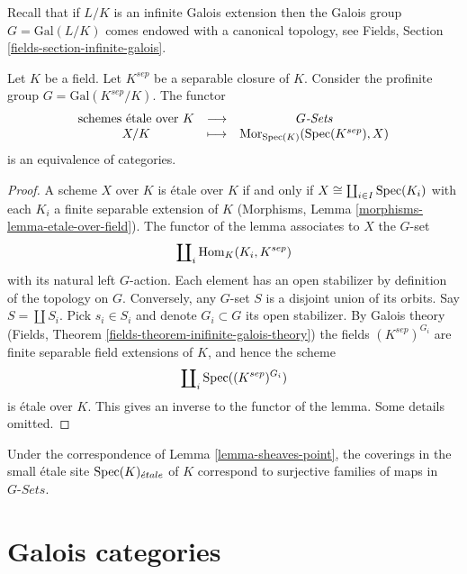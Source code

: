 \medskip\noindent
Recall that if $L/K$ is an infinite Galois extension then the
Galois group $G = \text{Gal}(L/K)$ comes endowed with a canonical
topology, see Fields, Section \ref{fields-section-infinite-galois}.

\begin{lemma}
\label{lemma-sheaves-point}
Let $K$ be a field. Let $K^{sep}$ be a separable closure of $K$.
Consider the profinite group $G = \text{Gal}(K^{sep}/K)$.
The functor
$$
\begin{matrix}
\text{schemes \'etale over }K &
\longrightarrow &
G\textit{-Sets} \\
X/K & \longmapsto &
\mathop{\mathrm{Mor}}\nolimits_{\mathop{\mathrm{Spec}}(K)}(\mathop{\mathrm{Spec}}(K^{sep}), X)
\end{matrix}
$$
is an equivalence of categories.
\end{lemma}

\begin{proof}
A scheme $X$ over $K$ is \'etale over $K$ if and only if
$X \cong \coprod_{i\in I} \mathop{\mathrm{Spec}}(K_i)$ with
each $K_i$ a finite separable extension of $K$
(Morphisms, Lemma \ref{morphisms-lemma-etale-over-field}).
The functor of the lemma associates to $X$ the $G$-set
$$
\coprod\nolimits_i \mathop{\mathrm{Hom}}\nolimits_K(K_i, K^{sep})
$$
with its natural left $G$-action. Each element has an open stabilizer
by definition of the topology on $G$. Conversely, any $G$-set $S$
is a disjoint union of its orbits. Say $S = \coprod S_i$. Pick $s_i \in S_i$
and denote $G_i \subset G$ its open stabilizer. By Galois theory
(Fields, Theorem \ref{fields-theorem-inifinite-galois-theory})
the fields $(K^{sep})^{G_i}$ are finite separable field extensions of $K$, and
hence the scheme
$$
\coprod\nolimits_i \mathop{\mathrm{Spec}}((K^{sep})^{G_i})
$$
is \'etale over $K$. This gives an inverse to the functor of the lemma.
Some details omitted.
\end{proof}

\begin{remark}
\label{remark-covering-surjective}
Under the correspondence of Lemma \ref{lemma-sheaves-point},
the coverings in the small \'etale site
$\mathop{\mathrm{Spec}}(K)_{\acute{e}tale}$ of $K$ correspond to surjective families of
maps in $G\textit{-Sets}$.
\end{remark}









\section{Galois categories}
\label{section-galois}

